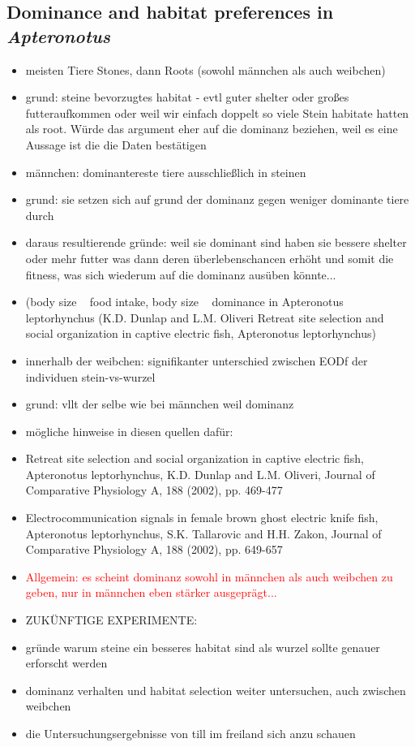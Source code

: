 \subsection{Dominance and habitat preferences in \textit{Apteronotus}}

\begin{itemize}
    \item meisten Tiere Stones, dann Roots (sowohl männchen als auch weibchen)
    \item grund: steine bevorzugtes habitat - evtl guter shelter oder großes futteraufkommen oder weil wir einfach doppelt so viele Stein habitate hatten als root. Würde das argument eher auf die dominanz beziehen, weil es eine Aussage ist die die Daten bestätigen
    
    \item männchen: dominantereste tiere ausschließlich in steinen
    \item grund: sie setzen sich auf grund der dominanz gegen weniger dominante tiere durch
    \item daraus resultierende gründe: weil sie dominant sind haben sie bessere shelter oder mehr futter was dann deren überlebenschancen erhöht und somit die fitness, was sich wiederum auf die dominanz ausüben könnte...
    \item (body size ~ food intake, body size ~ dominance in Apteronotus leptorhynchus (K.D. Dunlap and L.M. Oliveri Retreat site selection and social organization in captive electric fish, Apteronotus leptorhynchus)
    \item innerhalb der weibchen: signifikanter unterschied zwischen EODf der individuen stein-vs-wurzel
    \item grund: vllt der selbe wie bei männchen weil dominanz 
    
    \item mögliche hinweise in diesen quellen dafür:
    \item Retreat site selection and social organization in captive electric fish, Apteronotus leptorhynchus, K.D. Dunlap and L.M. Oliveri, Journal of Comparative Physiology A, 188 (2002), pp. 469-477
    \item Electrocommunication signals in female brown ghost electric knife fish, Apteronotus leptorhynchus, S.K. Tallarovic and H.H. Zakon, Journal of Comparative Physiology A, 188 (2002), pp. 649-657
    \item \textcolor{red}{Allgemein: es scheint dominanz sowohl in männchen als auch weibchen zu geben, nur in männchen eben stärker ausgeprägt...}
    \item ZUKÜNFTIGE EXPERIMENTE:
    \item gründe warum steine ein besseres habitat sind als wurzel sollte genauer erforscht werden
    \item dominanz verhalten und habitat selection weiter untersuchen, auch zwischen weibchen 
    \item die Untersuchungsergebnisse von till im freiland sich anzu schauen 
\end{itemize}{}

